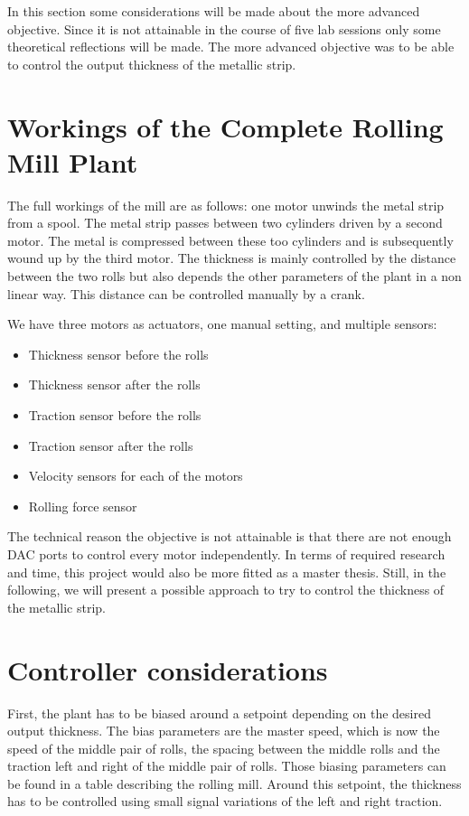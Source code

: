 In this section some considerations will be made about the more advanced objective. Since it is not attainable in the course of five lab sessions only some theoretical reflections will be made. The more advanced objective was to be able to control the output thickness of the metallic strip.

\section{Workings of the Complete Rolling Mill Plant}
The full workings of the mill are as follows: one motor unwinds the metal strip from a spool. The metal strip passes between two cylinders driven by a second motor. The metal is compressed between these too cylinders and is subsequently wound up by the third motor. The thickness is mainly controlled by the distance between the two rolls but also depends the other parameters of the plant in a non linear way. This distance can be controlled manually by a crank.

We have three motors as actuators, one manual setting, and multiple sensors:
\begin{itemize}
\item Thickness sensor before the rolls
\item Thickness sensor after the rolls
\item Traction sensor before the rolls
\item Traction sensor after the rolls
\item Velocity sensors for each of the motors
\item Rolling force sensor
\end{itemize}
The technical reason the objective is not attainable is that there are not enough DAC ports to control every motor independently. In terms of required research and time, this project would also be more fitted as a master thesis. Still, in the following, we will present a possible approach to try to control the thickness of the metallic strip.

\section{Controller considerations}
First, the plant has to be biased around a setpoint depending on the desired output thickness. The bias parameters are the master speed, which is now the speed of the middle pair of rolls, the spacing between the middle rolls and the traction left and right of the middle pair of rolls. Those biasing parameters can be found in a table describing the rolling mill. Around this setpoint, the thickness has to be controlled using small signal variations of the left and right traction.

